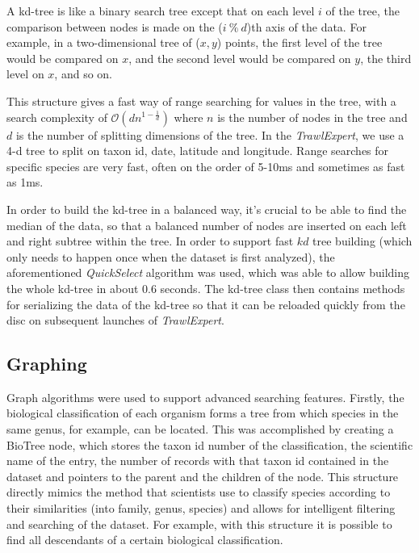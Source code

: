 \documentclass{article}
\begin{document}
A kd-tree is like a binary search tree except that on each level $i$ of the tree, the comparison between nodes is made on the ($i\ \%\ d$)th axis of the data. For example, in a two-dimensional tree of ($x,y$) points, the first level of the tree would be compared on $x$, and the second level would be compared on $y$, the third level on $x$, and so on.

This structure gives a fast way of range searching for values in the tree, with a search complexity of $\mathcal{O}(dn^{1-\frac{1}{d}})$ where $n$ is the number of nodes in the tree and $d$ is the number of splitting dimensions of the tree. In the \textit{TrawlExpert}, we use a 4-d tree to split on taxon id, date, latitude and longitude. Range searches for specific species are very fast, often on the order of 5-10ms and sometimes as fast as 1ms.

In order to build the kd-tree in a balanced way, it's crucial to be able to find the median of the data, so that a balanced number of nodes are inserted on each left and right subtree within the tree. In order to support fast $kd$ tree building (which only needs to happen once when the dataset is first analyzed), the aforementioned \textit{QuickSelect} algorithm was used, which was able to allow building the whole kd-tree in about 0.6 seconds. The kd-tree class then contains methods for serializing the data of the kd-tree so that it can be reloaded quickly from the disc on subsequent launches of \textit{TrawlExpert}.

%
%

\subsection{Graphing}
Graph algorithms were used to support advanced searching features. Firstly, the biological classification of each organism forms a tree from which species in the same genus, for example, can be located. This was accomplished by creating a BioTree node, which stores the taxon id number of the classification, the scientific name of the entry, the number of records with that taxon id contained in the dataset and pointers to the parent and the children of the node. This structure directly mimics the method that scientists use to classify species according to their similarities (into family, genus, species) and allows for intelligent filtering and searching of the dataset. For example, with this structure it is possible to find all descendants of a certain biological classification.
\end{document}
